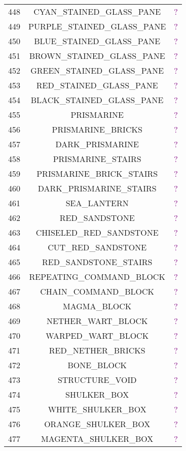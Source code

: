 \documentclass[11pt]{article}
\newcommand\myworries[1]{\textcolor{purple}{#1}}
\begin{document}
\begin{longtable}{ |c|c|c| }
	448 & CYAN\_STAINED\_GLASS\_PANE & \myworries{?} \\
	449 & PURPLE\_STAINED\_GLASS\_PANE & \myworries{?} \\
	450 & BLUE\_STAINED\_GLASS\_PANE & \myworries{?} \\
	451 & BROWN\_STAINED\_GLASS\_PANE & \myworries{?} \\
	452 & GREEN\_STAINED\_GLASS\_PANE & \myworries{?} \\
	453 & RED\_STAINED\_GLASS\_PANE & \myworries{?} \\
	454 & BLACK\_STAINED\_GLASS\_PANE & \myworries{?} \\
	455 & PRISMARINE & \myworries{?} \\
	456 & PRISMARINE\_BRICKS & \myworries{?} \\
	457 & DARK\_PRISMARINE & \myworries{?} \\
	458 & PRISMARINE\_STAIRS & \myworries{?} \\
	459 & PRISMARINE\_BRICK\_STAIRS & \myworries{?} \\
	460 & DARK\_PRISMARINE\_STAIRS & \myworries{?} \\
	461 & SEA\_LANTERN & \myworries{?} \\
	462 & RED\_SANDSTONE & \myworries{?} \\
	463 & CHISELED\_RED\_SANDSTONE & \myworries{?} \\
	464 & CUT\_RED\_SANDSTONE & \myworries{?} \\
	465 & RED\_SANDSTONE\_STAIRS & \myworries{?} \\
	466 & REPEATING\_COMMAND\_BLOCK & \myworries{?} \\
	467 & CHAIN\_COMMAND\_BLOCK & \myworries{?} \\
	468 & MAGMA\_BLOCK & \myworries{?} \\
	469 & NETHER\_WART\_BLOCK & \myworries{?} \\
	470 & WARPED\_WART\_BLOCK & \myworries{?} \\
	471 & RED\_NETHER\_BRICKS & \myworries{?} \\
	472 & BONE\_BLOCK & \myworries{?} \\
	473 & STRUCTURE\_VOID & \myworries{?} \\
	474 & SHULKER\_BOX & \myworries{?} \\
	475 & WHITE\_SHULKER\_BOX & \myworries{?} \\
	476 & ORANGE\_SHULKER\_BOX & \myworries{?} \\
	477 & MAGENTA\_SHULKER\_BOX & \myworries{?} \\

\end{longtable}
\end{document}
